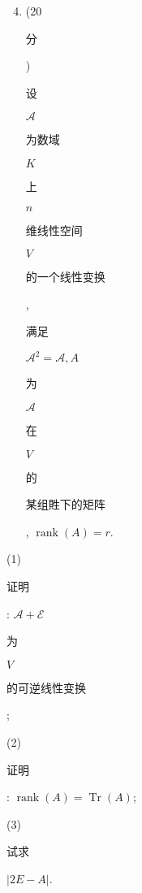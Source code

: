 \documentclass[10pt]{article}
\begin{document}
\begin{enumerate}
  \setcounter{enumi}{3}
  \item (20 \begin{CJK}{UTF8}{mj}分\end{CJK}) \begin{CJK}{UTF8}{mj}设\end{CJK} $\mathscr{A}$ \begin{CJK}{UTF8}{mj}为数域\end{CJK} $K$ \begin{CJK}{UTF8}{mj}上\end{CJK} $n$ \begin{CJK}{UTF8}{mj}维线性空间\end{CJK} $V$ \begin{CJK}{UTF8}{mj}的一个线性变换\end{CJK}, \begin{CJK}{UTF8}{mj}满足\end{CJK} $\mathscr{A}^{2}=\mathscr{A}, A$ \begin{CJK}{UTF8}{mj}为\end{CJK} $\mathscr{A}$ \begin{CJK}{UTF8}{mj}在\end{CJK} $V$ \begin{CJK}{UTF8}{mj}的\end{CJK} \begin{CJK}{UTF8}{mj}某组貹下的矩阵\end{CJK}, $\operatorname{rank}(A)=r$.
\end{enumerate}
(1) \begin{CJK}{UTF8}{mj}证明\end{CJK}: $\mathscr{A}+\mathscr{E}$ \begin{CJK}{UTF8}{mj}为\end{CJK} $V$ \begin{CJK}{UTF8}{mj}的可逆线性变换\end{CJK};

(2) \begin{CJK}{UTF8}{mj}证明\end{CJK}: $\operatorname{rank}(A)=\operatorname{Tr}(A)$;

(3) \begin{CJK}{UTF8}{mj}试求\end{CJK} $|2 E-A|$.
\end{document}
